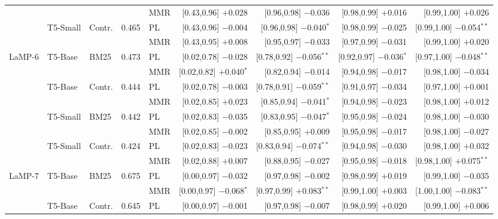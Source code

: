 \documentclass[10pt,twocolumn]{article}
\begin{document}
\begin{table}[t]
\begin{tabular}{@{}lllrlrrrr@{}}
 & & & & MMR & [0.43,0.96] $+$0.028 & [0.96,0.98] $-$0.036 & [0.98,0.99] $+$0.016 & [0.99,1.00] $+$0.026 \\
\cmidrule(lr){1-9}
 & \multirow{2}{*}{T5-Small} & \multirow{2}{*}{Contr.} & \multirow{2}{*}{0.465} & PL & [0.43,0.96] $-$0.004 & [0.96,0.98] $-$0.040$^{*}$ & [0.98,0.99] $-$0.025 & [0.99,1.00] $-$0.054$^{**}$ \\
 & & & & MMR & [0.43,0.95] $+$0.008 & [0.95,0.97] $-$0.033 & [0.97,0.99] $-$0.031 & [0.99,1.00] $+$0.020 \\
\midrule
\multirow{2}{*}{LaMP-6} & \multirow{2}{*}{T5-Base} & \multirow{2}{*}{BM25} & \multirow{2}{*}{0.473} & PL & [0.02,0.78] $-$0.028 & [0.78,0.92] $-$0.056$^{**}$ & [0.92,0.97] $-$0.036$^{*}$ & [0.97,1.00] $-$0.048$^{**}$ \\
 & & & & MMR & [0.02,0.82] $+$0.040$^{*}$ & [0.82,0.94] $-$0.014 & [0.94,0.98] $-$0.017 & [0.98,1.00] $-$0.034 \\
\cmidrule(lr){1-9}
 & \multirow{2}{*}{T5-Base} & \multirow{2}{*}{Contr.} & \multirow{2}{*}{0.444} & PL & [0.02,0.78] $-$0.003 & [0.78,0.91] $-$0.059$^{**}$ & [0.91,0.97] $-$0.034 & [0.97,1.00] $+$0.001 \\
 & & & & MMR & [0.02,0.85] $+$0.023 & [0.85,0.94] $-$0.041$^{*}$ & [0.94,0.98] $-$0.023 & [0.98,1.00] $+$0.012 \\
\cmidrule(lr){1-9}
 & \multirow{2}{*}{T5-Small} & \multirow{2}{*}{BM25} & \multirow{2}{*}{0.442} & PL & [0.02,0.83] $-$0.035 & [0.83,0.95] $-$0.047$^{*}$ & [0.95,0.98] $-$0.024 & [0.98,1.00] $-$0.030 \\
 & & & & MMR & [0.02,0.85] $-$0.002 & [0.85,0.95] $+$0.009 & [0.95,0.98] $-$0.017 & [0.98,1.00] $-$0.027 \\
\cmidrule(lr){1-9}
 & \multirow{2}{*}{T5-Small} & \multirow{2}{*}{Contr.} & \multirow{2}{*}{0.424} & PL & [0.02,0.83] $-$0.023 & [0.83,0.94] $-$0.074$^{**}$ & [0.94,0.98] $-$0.030 & [0.98,1.00] $+$0.032 \\
 & & & & MMR & [0.02,0.88] $+$0.007 & [0.88,0.95] $-$0.027 & [0.95,0.98] $-$0.018 & [0.98,1.00] $+$0.075$^{**}$ \\
\midrule
\multirow{2}{*}{LaMP-7} & \multirow{2}{*}{T5-Base} & \multirow{2}{*}{BM25} & \multirow{2}{*}{0.675} & PL & [0.00,0.97] $-$0.032 & [0.97,0.98] $-$0.002 & [0.98,0.99] $+$0.019 & [0.99,1.00] $-$0.035 \\
 & & & & MMR & [0.00,0.97] $-$0.068$^{*}$ & [0.97,0.99] $+$0.083$^{**}$ & [0.99,1.00] $+$0.003 & [1.00,1.00] $-$0.083$^{**}$ \\
\cmidrule(lr){1-9}
 & \multirow{2}{*}{T5-Base} & \multirow{2}{*}{Contr.} & \multirow{2}{*}{0.645} & PL & [0.00,0.97] $-$0.001 & [0.97,0.98] $-$0.007 & [0.98,0.99] $+$0.020 & [0.99,1.00] $+$0.006 \\

\end{tabular}
\end{table}
\end{document}
